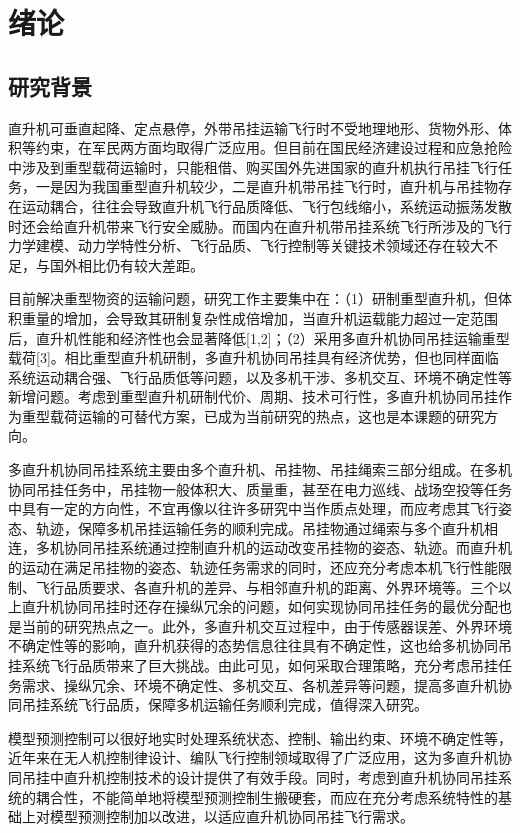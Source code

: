 \chapter{绪论}
\section{研究背景}
直升机可垂直起降、定点悬停，外带吊挂运输飞行时不受地理地形、货物外形、体积等约束，在军民两方面均取得广泛应用。但目前在国民经济建设过程和应急抢险中涉及到重型载荷运输时，只能租借、购买国外先进国家的直升机执行吊挂飞行任务，一是因为我国重型直升机较少，二是直升机带吊挂飞行时，直升机与吊挂物存在运动耦合，往往会导致直升机飞行品质降低、飞行包线缩小，系统运动振荡发散时还会给直升机带来飞行安全威胁。而国内在直升机带吊挂系统飞行所涉及的飞行力学建模、动力学特性分析、飞行品质、飞行控制等关键技术领域还存在较大不足，与国外相比仍有较大差距。

目前解决重型物资的运输问题，研究工作主要集中在：（1）研制重型直升机，但体积重量的增加，会导致其研制复杂性成倍增加，当直升机运载能力超过一定范围后，直升机性能和经济性也会显著降低[1,2]；（2）采用多直升机协同吊挂运输重型载荷[3]。相比重型直升机研制，多直升机协同吊挂具有经济优势，但也同样面临系统运动耦合强、飞行品质低等问题，以及多机干涉、多机交互、环境不确定性等新增问题。考虑到重型直升机研制代价、周期、技术可行性，多直升机协同吊挂作为重型载荷运输的可替代方案，已成为当前研究的热点，这也是本课题的研究方向。

多直升机协同吊挂系统主要由多个直升机、吊挂物、吊挂绳索三部分组成。在多机协同吊挂任务中，吊挂物一般体积大、质量重，甚至在电力巡线、战场空投等任务中具有一定的方向性，不宜再像以往许多研究中当作质点处理，而应考虑其飞行姿态、轨迹，保障多机吊挂运输任务的顺利完成。吊挂物通过绳索与多个直升机相连，多机协同吊挂系统通过控制直升机的运动改变吊挂物的姿态、轨迹。而直升机的运动在满足吊挂物的姿态、轨迹任务需求的同时，还应充分考虑本机飞行性能限制、飞行品质要求、各直升机的差异、与相邻直升机的距离、外界环境等。三个以上直升机协同吊挂时还存在操纵冗余的问题，如何实现协同吊挂任务的最优分配也是当前的研究热点之一。此外，多直升机交互过程中，由于传感器误差、外界环境不确定性等的影响，直升机获得的态势信息往往具有不确定性，这也给多机协同吊挂系统飞行品质带来了巨大挑战。由此可见，如何采取合理策略，充分考虑吊挂任务需求、操纵冗余、环境不确定性、多机交互、各机差异等问题，提高多直升机协同吊挂系统飞行品质，保障多机运输任务顺利完成，值得深入研究。

模型预测控制可以很好地实时处理系统状态、控制、输出约束、环境不确定性等，近年来在无人机控制律设计、编队飞行控制领域取得了广泛应用，这为多直升机协同吊挂中直升机控制技术的设计提供了有效手段。同时，考虑到直升机协同吊挂系统的耦合性，不能简单地将模型预测控制生搬硬套，而应在充分考虑系统特性的基础上对模型预测控制加以改进，以适应直升机协同吊挂飞行需求。


